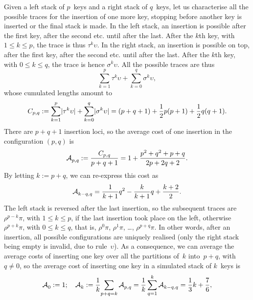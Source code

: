 Given a left stack of \(p\)~keys and a right stack of \(q\)~keys, let
us characterise all the possible traces for the insertion of one more
key, stopping before another key is inserted or the final stack is
made. In the left stack, an insertion is possible after the first key,
after the second etc. until after the last. After the \(k\)th key,
with \(1 \leqslant k \leqslant p\), the trace is thus
\(\tau^k\upsilon\). In the right stack, an insertion is possible on
top, after the first key, after the second etc. until after the
last. After the \(k\)th key, with \(0 \leqslant k \leqslant q\), the
trace is hence \(\sigma^k\upsilon\). All the possible traces are thus
\begin{equation*}
\sum_{k=1}^{p}{\tau^k\upsilon} + \sum_{k=0}^{q}{\sigma^k\upsilon},
\end{equation*}
whose cumulated lengths amount to
\begin{equation*}
C_{p,q} := \sum_{k=1}^{p}\lvert{\tau^k\upsilon}\rvert{} +
\sum_{k=0}^{q}\lvert{\sigma^k\upsilon}\rvert{}
= (p+q+1) + \frac{1}{2}p(p+1) + \frac{1}{2}q(q+1).
\end{equation*}
There are \(p+q+1\) insertion loci, so the average cost of one
insertion in the configuration \((p,q)\) is
\begin{equation}
\mathcal{A}_{p,q}^{} := \frac{C_{p,q}}{p+q+1}
           = 1 + \frac{p^2 + q^2 + p + q}{2p + 2q + 2}.
\label{eq:Mpq}
\end{equation}
By letting \(k := p + q\), we can re\hyp{}express this cost as
\begin{equation*}
\mathcal{A}_{k-q,q}^{} = \frac{1}{k+1}{q^2} - \frac{k}{k+1}{q} + \frac{k+2}{2}.
\end{equation*}
The left stack is reversed after the last insertion, so the subsequent
traces are \(\rho^{p-k}\pi\), with \(1 \leqslant k \leqslant p\), if
the last insertion took place on the left, otherwise
\(\rho^{p+k}\pi\), with \(0 \leqslant k \leqslant q\), that is,
\(\rho^0\pi\), \(\rho^1\pi\), \ldots, \(\rho^{p+q}\pi\). In other
words, after an insertion, all possible configurations are uniquely
realised (only the right stack being empty is invalid, due to
rule~\(\upsilon\)). As a consequence, we can average the average costs
of inserting one key over all the partitions of~\(k\) into~\(p + q\),
with \(q \neq 0\), so the average cost of inserting one key in a
simulated stack of \(k\)~keys is
\begin{equation*}
\mathcal{A}_{0}^{} := 1;\quad
\mathcal{A}_{k}^{} := \frac{1}{k}\!\sum_{p+q=k}\mathcal{A}_{p,q}^{}
         = \frac{1}{k}\sum_{q=1}^{k}\mathcal{A}_{k-q,q}^{}
         = \frac{1}{3}k + \frac{7}{6},
\end{equation*}
